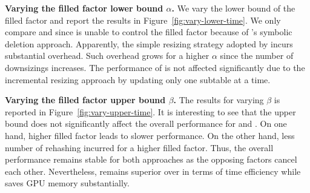 \vspace{1mm}\noindent\textbf{Varying the filled factor lower bound $\alpha$.}
We vary the lower bound of the filled factor and report the results in Figure~\ref{fig:vary-lower-time}. 
We only compare \megakv and \voter since \slab is unable to control the filled factor because of \slab's symbolic deletion approach. 
Apparently, the simple resizing strategy adopted by \megakv incurs substantial overhead. Such overhead grows for a higher $\alpha$ since the number of downsizings increases. The performance of \voter is not affected significantly due to the incremental resizing approach by updating only one subtable at a time. 



\vspace{1mm}\noindent\textbf{Varying the filled factor upper bound $\beta$.}
The results for varying $\beta$ is reported in Figure~\ref{fig:vary-upper-time}. 
It is interesting to see that the upper bound does not significantly affect the overall performance for \megakv and \voter. 
On one hand, higher filled factor leads to slower  performance. On the other hand, less number of rehashing incurred for a higher filled factor. Thus, the overall performance remains stable for both approaches as the opposing factors cancel each other. Nevertheless, \voter remains superior over \megakv in terms of time efficiency while saves GPU memory substantially.


